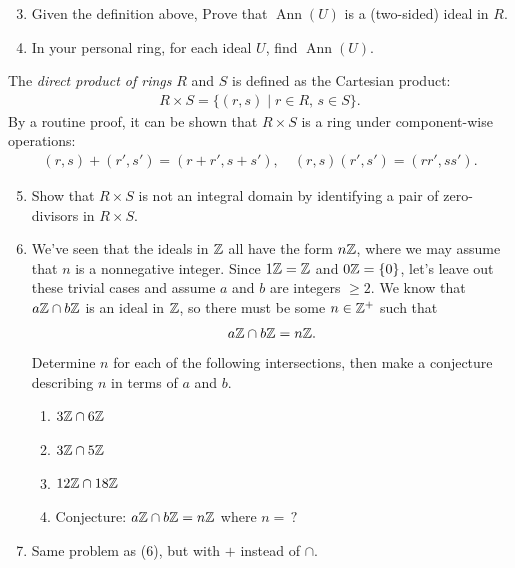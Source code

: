 \begin{enumerate}
\setcounter{enumi}{2}
\setlength{\itemsep}{10pt} %
    \item Given the definition above, Prove that $\operatorname{Ann}(U)$ is a (two-sided) ideal in $R$.

    \item In your personal ring, for each ideal $U$, find $\operatorname{Ann}(U)$. \\ \steezybreak
\end{enumerate}
\begin{definition}
    The \emph{direct product of rings} $R$ and $S$ is defined as the Cartesian product:
    \begin{align*}
        R \times S = \{ (r,s) \mid r \in R, \, s \in S \}.
    \end{align*}
    By a routine proof, it can be shown that $R \times S$ is a ring under component-wise operations:
    \begin{align*}
        (r,s) + (r',s') = (r + r', s + s'), \quad (r,s) (r',s') = (rr', ss').
    \end{align*}
\end{definition}
\begin{enumerate}
    \setcounter{enumi}{4}
    \setlength{\itemsep}{10pt} %
    \item Show that $R \times S$ is not an integral domain by identifying a pair of zero-divisors in $R \times S$.

    \item We've seen that the ideals in ${\mathbb{ Z}}$ all have the form $n{\mathbb{ Z}}$, where we may assume that $n$ is a nonnegative integer. Since $1{\mathbb{ Z}} = {\mathbb{ Z}}$ and $0{\mathbb{ Z}} = \{0\}$, let's leave out these trivial cases and assume $a$ and $b$ are integers $\geq 2$. We know that $a{\mathbb{ Z}} \cap b{\mathbb{ Z}}$ is an ideal in ${\mathbb{ Z}}$, so there must be some $n \in {\mathbb{ Z}}^{+}$ such that
    \[
    a{\mathbb{ Z}} \cap b{\mathbb{ Z}} = n{\mathbb{ Z}}.
    \]
    Determine $n$ for each of the following intersections, then make a conjecture describing $n$ in terms of $a$ and $b$.
    \begin{enumerate}
        \item $3{\mathbb{ Z}} \cap 6{\mathbb{ Z}}$
        \item $3{\mathbb{ Z}} \cap 5{\mathbb{ Z}}$
        \item $12{\mathbb{ Z}} \cap 18{\mathbb{ Z}}$
        \item Conjecture: $a{\mathbb{ Z}} \cap b{\mathbb{ Z}} = n{\mathbb{ Z}}$ where $n = \, ?$
    \end{enumerate}

    \item Same problem as (6), but with $+$ instead of $\cap$.
\end{enumerate}

